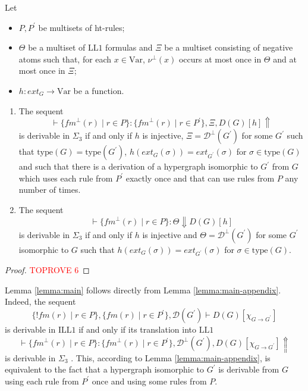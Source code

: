 \documentclass[a4paper,UKenglish,cleveref, autoref, thm-restate,pdfa]{lipics-v2021}
\newcommand{\ext}{\mathit{ext}}
\newcommand{\type}{\mathrm{type}}
\newcommand{\Var}{\mathrm{Var}}
\newcommand{\bang}{{!}}
\newcommand{\LLFO}{\mathrm{LL}1}
\newcommand{\ILLFO}{\mathrm{ILL}1}
\newcommand{\fm}{\mathit{fm}}
\newcommand{\diag}{\mathcal{D}}
\begin{document}
\begin{lemma}\label{lemma:main-appendix}
	\leavevmode
	Let 
	\begin{itemize}
		\item $P,P^\prime$ be multisets of ht-rules; 
		\item $\Theta$ be a multiset of $\LLFO$ formulas and $\Xi$ be a multiset consisting of negative atoms such that, for each $x \in \Var$, $\nu^\bot(x)$ occurs at most once in $\Theta$ and at most once in $\Xi$; 
		\item $h:\ext_G \to \Var$ be a function. 
	\end{itemize}
	\begin{enumerate}
		\item The sequent 
		\begin{equation}\label{equation:sequent-fm-1}
			\vdash \{\fm^\bot(r) \mid r \in P\} : \{\fm^\bot(r) \mid r \in P^\prime\}, \Xi, D(G)[h] \Uparrow
		\end{equation}
		is derivable in $\Sigma_3$ if and only if $h$ is injective, $\Xi=\diag^\bot(G^\prime)$ for some $G^\prime$ such that $\type(G)=\type(G^\prime)$, $h(\ext_G(\sigma)) = \ext_{G^\prime}(\sigma)$ for $\sigma \in \type(G)$ and such that there is a derivation of a hypergraph isomorphic to $G^\prime$ from $G$ which uses each rule from $P^\prime$ exactly once and that can use rules from $P$ any number of times.
		\item The sequent 
		\begin{equation}\label{equation:sequent-fm-2}
			\vdash \{\fm^\bot(r) \mid r \in P\} : \Theta \Downarrow D(G)[h]
		\end{equation}
		is derivable in $\Sigma_3$ if and only if $h$ is injective and $\Theta=\diag^\bot(G^\prime)$ for some $G^\prime$ isomorphic to $G$ such that $h(\ext_G(\sigma)) = \ext_{G^\prime}(\sigma)$ for $\sigma \in \type(G)$.
	\end{enumerate}
\end{lemma}
\begin{proof}\textcolor{red}{TOPROVE 6}\end{proof}

Lemma \ref{lemma:main} follows directly from Lemma \ref{lemma:main-appendix}. Indeed, the sequent 
$$
\{\bang \fm(r) \mid r \in P \}, \{\fm(r) \mid r \in P^\prime \}, \diag(G^\prime) \vdash D(G)[\chi_{G \to G^\prime}]
$$ 
is derivable in $\ILLFO$ if and only if its translation into $\LLFO$
$$
\vdash \{\fm^\bot(r) \mid r \in P \}: \{\fm^\bot(r) \mid r \in P^\prime \}, \diag^\bot(G^\prime) , D(G)[\chi_{G \to G^\prime}] \Uparrow
$$
is derivable in $\Sigma_3$ \cite[Theorems 1, 2]{Andreoli92}. This, according to Lemma \ref{lemma:main-appendix}, is equivalent to the fact that a hypergraph isomorphic to $G^\prime$ is derivable from $G$ using each rule from $P^\prime$ once and using some rules from $P$.
\end{document}
